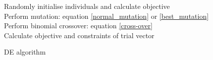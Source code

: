 \begin{algorithm}
\SetAlgoNoLine
 Randomly initialise individuals and calculate objective\\
 {
  {
  Perform mutation: equation \ref{normal_mutation} or \ref{best_mutation}\\
  Perform binomial crossover: equation \ref{cross-over}\\
  Calculate objective and constraints of trial vector
  }
 }
 \caption{DE algorithm}
 \label{DE algorithm}
\end{algorithm}